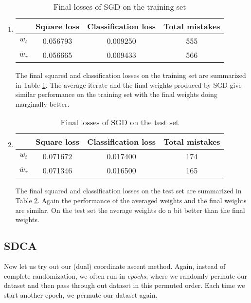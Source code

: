 \documentclass{article}
\begin{document}
\begin{enumerate}
	\item
	\begin{table}[h!]
		\centering
		\begin{tabular}{|c|c|c|c|}\hline
		     & {\bf Square loss} & {\bf Classification loss} & {\bf Total mistakes}  \\ \hline
		     $w_t$            & 0.056793	& 0.009250	 & 555	\\ \hline
		     $\overline w_\tau$  & 0.056665	& 0.009433	 & 566	\\ \hline
		\end{tabular}
		\caption{Final losses of SGD on the training set}
		\label{tab:sgd_final_loss_train}
	\end{table}

	The final squared and classification losses on the training set are summarized in Table \ref{tab:sgd_final_loss_train}. The average iterate and the final weights produced by SGD give similar performance on the training set with the final weights doing marginally better.

	\item
	\begin{table}[h!]
		\centering
		\begin{tabular}{|c|c|c|c|}\hline
		     & {\bf Square loss} & {\bf Classification loss} & {\bf Total mistakes}  \\ \hline
		     $w_t$            & 0.071672	& 0.017400	 & 174	\\ \hline
		     $\overline w_\tau$  & 0.071346	& 0.016500	 & 165	\\ \hline
		\end{tabular}
		\caption{Final losses of SGD on the test set}
		\label{tab:sgd_final_loss_test}
	\end{table}

	The final squared and classification losses on the test set are summarized in Table \ref{tab:sgd_final_loss_test}. Again the performance of the averaged weights and the final weights are similar. On the test set the average weights do a bit better than the final weights.
\end{enumerate}



\subsection{SDCA}
Now let us try out our (dual) coordinate ascent method. Again, instead of complete randomization, we often run in \emph{epochs}, where we randomly permute our dataset and then pass through out dataset in this permuted order. Each time we start another epoch, we permute our dataset again.
\end{document}
